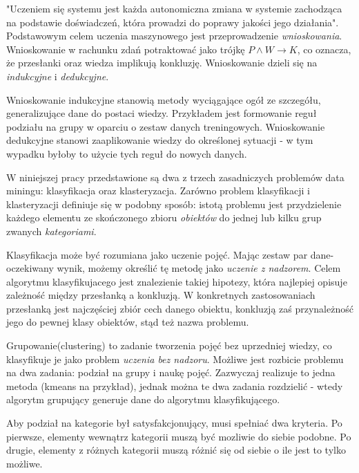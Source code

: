 \documentclass[12pt,a4paper,oneside]{report} %
\begin{document}
"Uczeniem się systemu jest każda autonomiczna zmiana w systemie zachodząca na podstawie doświadczeń, która prowadzi do poprawy jakości jego działania"\cite{cichosz}. Podstawowym celem uczenia maszynowego jest przeprowadzenie \emph{wnioskowania}. Wnioskowanie w rachunku zdań potraktować jako trójkę $ P \wedge W \rightarrow K $, co oznacza, że przesłanki oraz wiedza implikują konkluzję. Wnioskowanie dzieli się na \emph{indukcyjne} i \emph{dedukcyjne}. \par

Wnioskowanie indukcyjne stanowią metody wyciągające ogół ze szczegółu, generalizujące dane do postaci wiedzy. Przykładem jest formowanie reguł podziału na grupy w oparciu o zestaw danych treningowych. Wnioskowanie dedukcyjne stanowi zaaplikowanie wiedzy do określonej sytuacji - w tym wypadku byłoby to użycie tych reguł do nowych danych. \par

W niniejszej pracy przedstawione są dwa z trzech zasadniczych problemów data miningu: klasyfikacja oraz klasteryzacja. Zarówno problem klasyfikacji i klasteryzacji definiuje się w podobny sposób: istotą problemu jest przydzielenie każdego elementu ze skończonego zbioru \emph{obiektów} do jednej lub kilku grup zwanych \emph{kategoriami}. \par

Klasyfikacja może być rozumiana jako uczenie pojęć. Mając zestaw par dane\--ocze\-ki\-wa\-ny wynik, możemy określić tę metodę jako \emph{uczenie z nadzorem}. Celem algorytmu klasyfikujacego jest znalezienie takiej hipotezy, która najlepiej opisuje zależność między przesłanką a konkluzją. W konkretnych zastosowaniach przesłanką jest najczęściej zbiór cech danego obiektu, konkluzją zaś przynależność jego do pewnej klasy obiektów, stąd też nazwa problemu. \par

Grupowanie(clustering) to zadanie tworzenia pojęć bez uprzedniej wiedzy, co klasyfikuje je jako problem \emph{uczenia bez nadzoru}. Możliwe jest rozbicie problemu na dwa zadania: podział na grupy i naukę pojęć. Zazwyczaj realizuje to jedna metoda (kmeans na przykład), jednak można te dwa zadania rozdzielić - wtedy algorytm grupujący generuje dane do algorytmu klasyfikującego.\par

Aby podział na kategorie był satysfakcjonujący, musi spełniać dwa kryteria. Po pierwsze, elementy wewnątrz kategorii muszą być mozliwie do siebie podobne. Po drugie, elementy z różnych kategorii muszą różnić się od siebie o ile jest to tylko możliwe.\par
\end{document}
